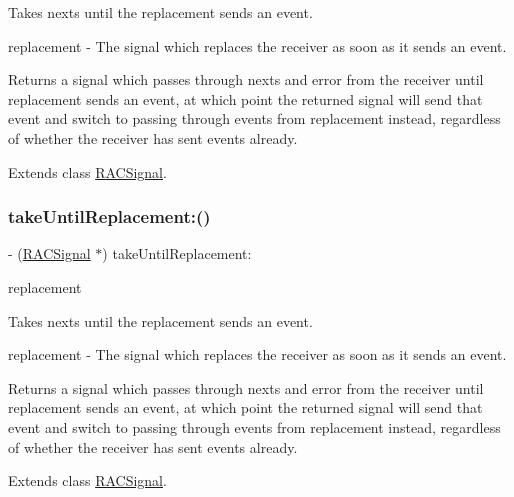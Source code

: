 Takes {\ttfamily next}s until the {\ttfamily replacement} sends an event.

replacement -\/ The signal which replaces the receiver as soon as it sends an event.

Returns a signal which passes through {\ttfamily next}s and {\ttfamily error} from the receiver until {\ttfamily replacement} sends an event, at which point the returned signal will send that event and switch to passing through events from {\ttfamily replacement} instead, regardless of whether the receiver has sent events already. 

Extends class \mbox{\hyperlink{interface_r_a_c_signal_aa8536c9726338e10176997936be011ed}{R\+A\+C\+Signal}}.

\mbox{\label{category_r_a_c_signal_07_operations_08_aa8536c9726338e10176997936be011ed}} 
\subsubsection{\texorpdfstring{take\+Until\+Replacement\+:()}{takeUntilReplacement:()}\hspace{0.1cm}{\footnotesize\ttfamily [3/3]}}
{\footnotesize\ttfamily -\/ (\mbox{\hyperlink{interface_r_a_c_signal}{R\+A\+C\+Signal}} $\ast$) take\+Until\+Replacement\+: \begin{DoxyParamCaption}\item[{(\mbox{\hyperlink{interface_r_a_c_signal}{R\+A\+C\+Signal}} $\ast$)}]{replacement }\end{DoxyParamCaption}}

Takes {\ttfamily next}s until the {\ttfamily replacement} sends an event.

replacement -\/ The signal which replaces the receiver as soon as it sends an event.

Returns a signal which passes through {\ttfamily next}s and {\ttfamily error} from the receiver until {\ttfamily replacement} sends an event, at which point the returned signal will send that event and switch to passing through events from {\ttfamily replacement} instead, regardless of whether the receiver has sent events already. 

Extends class \mbox{\hyperlink{interface_r_a_c_signal_aa8536c9726338e10176997936be011ed}{R\+A\+C\+Signal}}.

